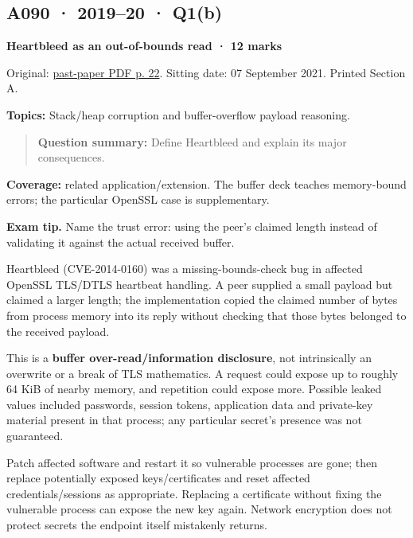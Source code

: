 \documentclass[11pt,a4paper]{article}
\begin{document}
\clearpage
\subsection{A090 · 2019–20 · Q1(b)}\label{a090}

\textbf{Heartbleed as an out-of-bounds read · 12 marks}


Original: \href{../../CSE405-Security_Merged.pdf\#page=22}{past-paper PDF p. 22}. Sitting date: 07 September 2021. Printed Section A.


\textbf{Topics:} Stack/\allowbreak{}heap corruption and buffer-overflow payload reasoning.



\begin{quote}\small

\textbf{Question summary:} Define Heartbleed and explain its major consequences.



\end{quote}

\textbf{Coverage:} related application/\allowbreak{}extension. The buffer deck teaches memory-bound errors; the particular OpenSSL case is supplementary.



{\color{ForestGreen}\textbf{Exam tip.} Name the trust error: using the peer's claimed length instead of validating it against the actual received buffer.}


Heartbleed (CVE-2014-0160) was a missing-bounds-check bug in affected OpenSSL TLS/\allowbreak{}DTLS heartbeat handling. A peer supplied a small payload but claimed a larger length; the implementation copied the claimed number of bytes from process memory into its reply without checking that those bytes belonged to the received payload.


This is a \textbf{buffer over-read/\allowbreak{}information disclosure},\allowbreak{} not intrinsically an overwrite or a break of TLS mathematics. A request could expose up to roughly 64 KiB of nearby memory,\allowbreak{} and repetition could expose more. Possible leaked values included passwords,\allowbreak{} session tokens,\allowbreak{} application data and private-key material present in that process; any particular secret's presence was not guaranteed.


Patch affected software and restart it so vulnerable processes are gone; then replace potentially exposed keys/\allowbreak{}certificates and reset affected credentials/\allowbreak{}sessions as appropriate. Replacing a certificate without fixing the vulnerable process can expose the new key again. Network encryption does not protect secrets the endpoint itself mistakenly returns.
\end{document}
